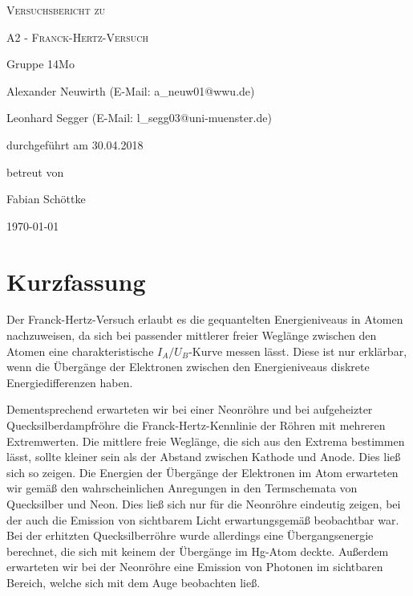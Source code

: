\documentclass[
	a4paper,
	12pt,
	pagesize,
	ngerman
]{scrartcl}
\begin{document}
	
	\begin{titlepage}
		\centering
		{\scshape\LARGE Versuchsbericht zu \par}
		\vspace{1cm}
		{\scshape\huge A2 - Franck-Hertz-Versuch \par} 
		\vspace{2.5cm}
		{\LARGE Gruppe 14Mo \par}
		\vspace{0.5cm}
		
		{\large Alexander Neuwirth (E-Mail: a\_neuw01@wwu.de) \par}
		{\large Leonhard Segger (E-Mail: l\_segg03@uni-muenster.de) \par}
		\vfill
		
		durchgeführt am 30.04.2018\par
		betreut von\par
		{\large Fabian Schöttke}
		
		\vfill
		
		{\large \today\par}
	\end{titlepage}
	\tableofcontents
	\newpage


	\section{Kurzfassung}
	Der Franck-Hertz-Versuch erlaubt es die gequantelten Energieniveaus in Atomen nachzuweisen, da sich bei passender mittlerer freier Weglänge zwischen den Atomen eine charakteristische $I_A/U_B$-Kurve messen lässt.
	Diese ist nur erklärbar, wenn die Übergänge der Elektronen zwischen den Energieniveaus diskrete Energiedifferenzen haben.
	
	Dementsprechend erwarteten wir bei einer Neonröhre und bei aufgeheizter Quecksilberdampfröhre die Franck-Hertz-Kennlinie der Röhren mit mehreren Extremwerten.
	Die mittlere freie Weglänge, die sich aus den Extrema bestimmen lässt, sollte kleiner sein als der Abstand zwischen Kathode und Anode.
	Dies ließ sich so zeigen.
	Die Energien der Übergänge der Elektronen im Atom erwarteten wir gemäß den wahrscheinlichen Anregungen in den Termschemata von Quecksilber und Neon.
	Dies ließ sich nur für die Neonröhre eindeutig zeigen, bei der auch die Emission von sichtbarem Licht erwartungsgemäß beobachtbar war.
	Bei der erhitzten Quecksilberröhre wurde allerdings eine Übergangsenergie berechnet, die sich mit keinem der Übergänge im Hg-Atom deckte.
	Außerdem erwarteten wir bei der Neonröhre eine Emission von Photonen im sichtbaren Bereich, welche sich mit dem Auge beobachten ließ.\\
		
\end{document}
